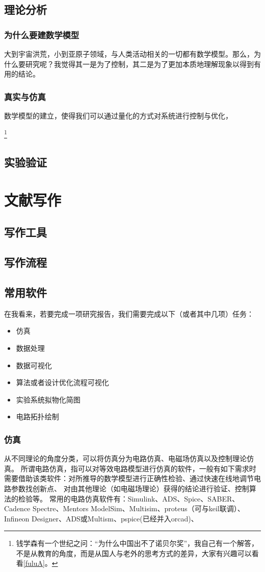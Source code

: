 \documentclass[UTF8,oneside]{ctexbook}
\begin{document}
\section{理论分析}
\subsection{为什么要建数学模型}
大到宇宙洪荒，小到亚原子领域，与人类活动相关的一切都有数学模型。那么，为什么要研究呢？我觉得其一是为了控制，其二是为了更加本质地理解现象以得到有用的结论。

\subsection{真实与仿真}
数学模型的建立，使得我们可以通过量化的方式对系统进行控制与优化，

\footnote{钱学森有一个世纪之问：“为什么中国出不了诺贝尔奖”，我自己有一个解答，不是从教育的角度，而是从国人与老外的思考方式的差异，大家有兴趣可以看看\ref{fuluA}。}

\section{实验验证}

\chapter{文献写作}
\section{写作工具}
\section{写作流程}
\section{常用软件}
在我看来，若要完成一项研究报告，我们需要完成以下（或者其中几项）任务：
\begin{itemize}
	\item 仿真
	\item 数据处理
	\item 数据可视化
	\item 算法或者设计优化流程可视化
	\item 实验系统拟物化简图
	\item 电路拓扑绘制
\end{itemize}
\subsection{仿真}
从不同理论的角度分类，可以将仿真分为电路仿真、电磁场仿真以及控制理论仿真。
所谓电路仿真，指可以对等效电路模型进行仿真的软件，一般有如下需求时需要借助该类软件：对所推导的数学模型进行正确性检验、通过快速在线地调节电路参数找创新点、
对由其他理论（如电磁场理论）获得的结论进行验证、控制算法的检验等。
常用的电路仿真软件有：Simulink、ADS、Spice、SABER、Cadence Spectre、Mentors ModelSim、Multisim、proteus（可与keil联调）、Infineon Designer、ADS或Multism、pspice(已经并入orcad)、
\end{document}
